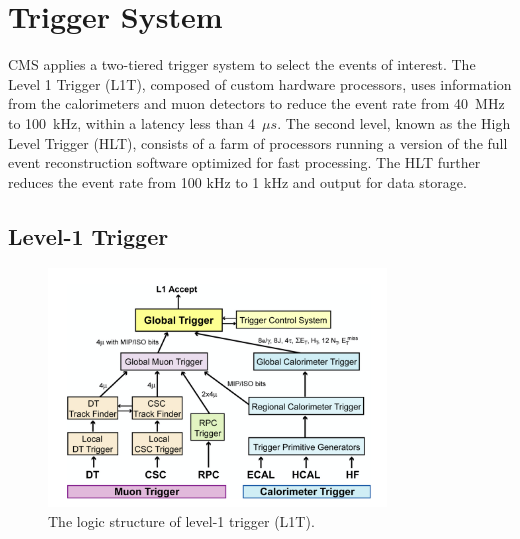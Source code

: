\section{Trigger System}
\label{sec:cmsExperiment:trigger}

CMS applies a two-tiered trigger system \cite{cms:trigger:Khachatryan:2016bia} to select the events of interest. The  Level 1 Trigger (L1T), composed of custom hardware processors, uses information from the calorimeters and muon detectors to reduce the event rate from 40~MHz to 100~kHz, within a latency less than 4~$\mu s$. The second level, known as the High Level Trigger (HLT), consists of a farm of processors running a version of the full event reconstruction software optimized for fast processing. The HLT further reduces the event rate from 100 kHz to 1 kHz and output for data storage.



\subsection{Level-1 Trigger}

\begin{figure}[ht]
    \centering
    \includegraphics[width=0.8\textwidth]{chapters/CMSExperiment/sectionTrigger/figures/trigger.png}
    \caption{The logic structure of level-1 trigger (L1T).}
    \label{fig:cmsExperiment:trigger:structure}
\end{figure}

